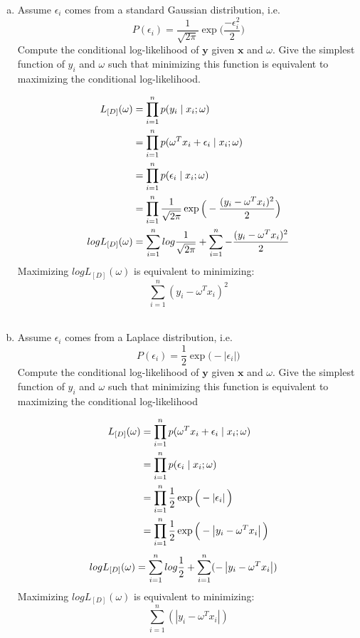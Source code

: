 \documentclass[11pt]{article}
\renewcommand{\vec}[1]{\mathbf{#1}}
\begin{document}
\begin{enumerate}[(a)]
\item Assume $\epsilon_i$ comes from a standard Gaussian distribution, i.e.
$$P(\epsilon_i) =  \frac{1}{\sqrt{2\pi}}\exp{\Big(\frac{-\epsilon_i^2}{2}\Big)}$$
Compute the conditional log-likelihood of $\textbf{y}$ given $\textbf{x}$ and $\omega$.  Give the simplest function of $y_i$ and $\omega$ such that minimizing this function is equivalent to maximizing the conditional log-likelihood. \\
\begin{answertext}{10cm}{}
\begin{align}
L_{[D]}(\omega) &= \prod_{i=1}^n p(y_i \mid x_i; \vec{\omega}) \notag\\
&= \prod_{i=1}^n p(\omega^Tx_i + \epsilon_i \mid x_i; \vec{\omega})  \notag\\
&= \prod_{i=1}^n p(\epsilon_i \mid x_i; \vec{\omega})  \notag\\
&= \prod_{i=1}^n \frac{1}{\sqrt{2\pi}}\exp{\Big(-\frac{(y_i-\omega^Tx_i)^2}{2}\Big)}  \notag\\
logL_{[D]}(\omega) &=\sum_{i=1}^n log \frac{1}{\sqrt{2\pi}} + \sum_{i=1}^n -\frac{(y_i-\omega^Tx_i)^2}{2}  \notag
\end{align}
Maximizing $logL_{[D]}(\omega)$ is equivalent to minimizing: \\
$$\sum_{i=1}^n  (y_i-\omega^Tx_i)^2$$\\
\end{answertext} 

\item Assume $\epsilon_i$ comes from a Laplace distribution, i.e.
$$P(\epsilon_i) =  \frac{1}{2}\exp{\Big(-|\epsilon_i|\Big)}$$
Compute the conditional log-likelihood of $\textbf{y}$ given $\textbf{x}$ and $\omega$.
Give the simplest function of $y_i$ and $\omega$ such that minimizing this function is equivalent to maximizing the conditional log-likelihood \\
\begin{answertext}{11cm}{}

\begin{align}
L_{[D]}(\omega) &= \prod_{i=1}^{n} p(\omega^Tx_i + \epsilon_i \mid x_i; \vec{\omega})  \notag\\
&= \prod_{i=1}^{n} p(\epsilon_i \mid x_i; \vec{\omega})  \notag\\
&= \prod_{i=1}^{n} \frac{1}{2}\exp{\Big{(}-\left|\epsilon_{i}\right|\Big{)}} \notag\\
&= \prod_{i=1}^{n} \frac{1}{2}\exp{\Big{(}-\left|y_{i}-\omega^{T}x_{i}\right|\Big{)}} \notag
\end{align}
\begin{align}
&logL_{[D]}(\omega) = \sum_{i=1}^{n} log \frac{1}{2} + \sum_{i=1}^{n} (-\left|y_{i}-\omega^{T}x_{i}\right|) \notag
\end{align}
Maximizing $logL_{[D]}(\omega)$ is equivalent to minimizing: \\
$$\sum_{i=1}^{n} (\left|y_{i}-\omega^{T}x_{i}\right|) $$ \\


\end{answertext}
\end{enumerate}
\end{document}
